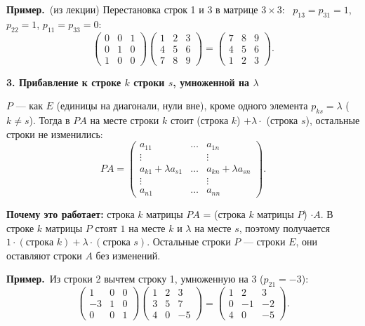\documentclass[a4paper,11pt]{article}
\newcommand{\prim}{\par\smallskip\noindent\textbf{\textcolor{teoc!80!black}{Пример.}}\ }
\newcommand{\podr}[1]{\par\needspace{8\baselineskip}\medskip
  {\large\bfseries\textcolor{oprc!80!black}{#1}}\par\nopagebreak\smallskip}
\begin{document}
\prim (из лекции) Перестановка строк 1 и 3 в матрице $3 \times 3$: \ $p_{13} = p_{31} = 1$, $p_{22} = 1$, $p_{11} = p_{33} = 0$:
\[
  \begin{pmatrix} 0 & 0 & 1 \\ 0 & 1 & 0 \\ 1 & 0 & 0 \end{pmatrix}
  \begin{pmatrix} 1 & 2 & 3 \\ 4 & 5 & 6 \\ 7 & 8 & 9 \end{pmatrix}
  = \begin{pmatrix} 7 & 8 & 9 \\ 4 & 5 & 6 \\ 1 & 2 & 3 \end{pmatrix}.
\]

\podr{3. Прибавление к строке $k$ строки $s$, умноженной на $\lambda$}

\begin{opr}
$P$ --- как $E$ (единицы на диагонали, нули вне), кроме одного элемента $p_{ks} = \lambda$ ($k \ne s$).
Тогда в $PA$ на месте строки $k$ стоит (строка $k$) $+ \lambda \cdot$ (строка $s$), остальные строки не изменились:
\[
  PA = \begin{pmatrix}
  a_{11} & \dots & a_{1n} \\
  \vdots & & \vdots \\
  a_{k1} + \lambda a_{s1} & \dots & a_{kn} + \lambda a_{sn} \\
  \vdots & & \vdots \\
  a_{n1} & \dots & a_{nn}
  \end{pmatrix}.
\]
\end{opr}

\textbf{Почему это работает:} строка $k$ матрицы $PA$ = (строка $k$ матрицы $P$) $\cdot A$. В строке $k$ матрицы $P$
стоят $1$ на месте $k$ и $\lambda$ на месте $s$, поэтому получается $1 \cdot (\text{строка } k) + \lambda \cdot (\text{строка } s)$.
Остальные строки $P$ --- строки $E$, они оставляют строки $A$ без изменений.

\prim Из строки 2 вычтем строку 1, умноженную на 3 ($p_{21} = -3$):
\[
  \begin{pmatrix} 1 & 0 & 0 \\ -3 & 1 & 0 \\ 0 & 0 & 1 \end{pmatrix}
  \begin{pmatrix} 1 & 2 & 3 \\ 3 & 5 & 7 \\ 4 & 0 & -5 \end{pmatrix}
  = \begin{pmatrix} 1 & 2 & 3 \\ 0 & -1 & -2 \\ 4 & 0 & -5 \end{pmatrix}.
\]
\end{document}
